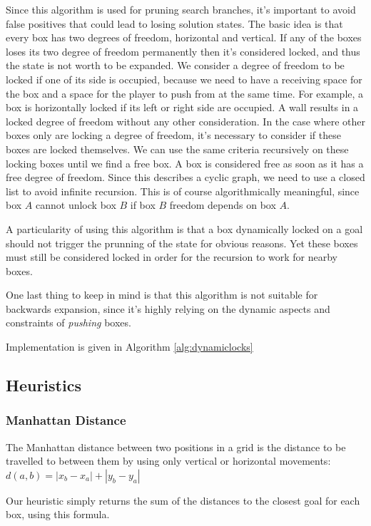 \documentclass[a4paper,11pt]{article}
\begin{document}
Since this algorithm is used for pruning search branches, it's
important to avoid false positives that could lead to losing solution
states. The basic idea is that every box has two degrees of freedom,
horizontal and vertical. If any of the boxes loses its two degree of
freedom permanently then it's considered locked, and thus the state is
not worth to be expanded. We consider a degree of freedom to be locked
if one of its side is occupied, because we need to have a receiving
space for the box and a space for the player to push from at the same
time. For example, a box is horizontally locked if its left or right
side are occupied. A wall results in a locked degree of freedom
without any other consideration. In the case where other boxes only
are locking a degree of freedom, it's necessary to consider if these
boxes are locked themselves. We can use the same criteria recursively
on these locking boxes until we find a free box. A box is considered
free as soon as it has a free degree of freedom. Since this describes
a cyclic graph, we need to use a closed list to avoid infinite
recursion. This is of course algorithmically meaningful, since box $A$
cannot unlock box $B$ if box $B$ freedom depends on box $A$.

A particularity of using this algorithm is that a box dynamically
locked on a goal should not trigger the prunning of the state for
obvious reasons. Yet these boxes must still be considered locked in
order for the recursion to work for nearby boxes.

One last thing to keep in mind is that this
algorithm is not suitable for backwards expansion, since it's highly
relying on the dynamic aspects and constraints of \emph{pushing}
boxes.

Implementation is given in Algorithm \ref{alg:dynamiclocks}


\subsection{Heuristics}

\subsubsection{Manhattan Distance}

The Manhattan distance between two positions in a grid is the distance to be
travelled to between them by using only vertical or horizontal movements:
$ d(a,b) = |x_b - x_a | + |y_b - y_a | $

Our heuristic simply returns the sum of the distances to the closest goal for
each box, using this formula.
\end{document}
